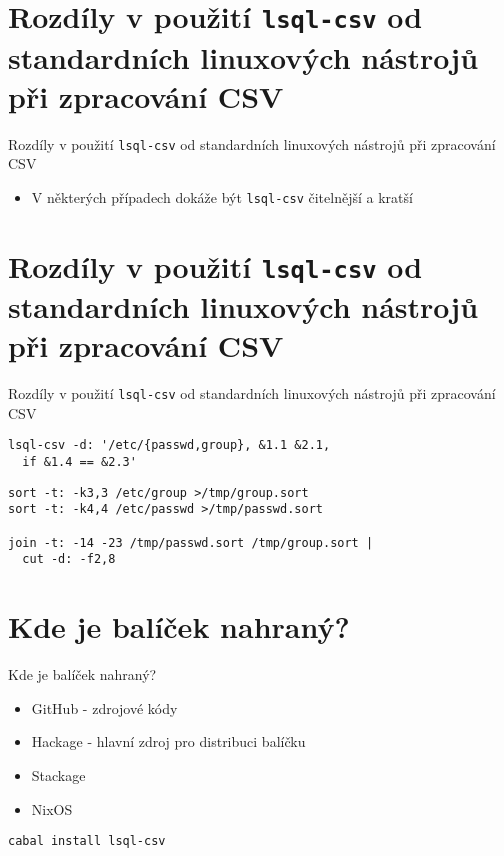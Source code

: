\documentclass{beamer}
\def\icode#1{\texttt{#1}}
\begin{document}
\section{Rozdíly v použití \icode{lsql-csv} od standardních linuxových nástrojů při zpracování CSV}
\begin{frame}[fragile]{Rozdíly v použití \icode{lsql-csv} od standardních linuxových nástrojů při zpracování CSV}
\begin{itemize}
\item V některých případech dokáže být \icode{lsql-csv} čitelnější a kratší
\end{itemize}
\end{frame}


\section{Rozdíly v použití \icode{lsql-csv} od standardních linuxových nástrojů při zpracování CSV}
\begin{frame}[fragile]{Rozdíly v použití \icode{lsql-csv} od standardních linuxových nástrojů při zpracování CSV}
\begin{verbatim}
lsql-csv -d: '/etc/{passwd,group}, &1.1 &2.1, 
  if &1.4 == &2.3'
\end{verbatim}


\vskip 1cm

\begin{verbatim}
sort -t: -k3,3 /etc/group >/tmp/group.sort
sort -t: -k4,4 /etc/passwd >/tmp/passwd.sort

join -t: -14 -23 /tmp/passwd.sort /tmp/group.sort |
  cut -d: -f2,8
\end{verbatim}
\end{frame}


\section{Kde je balíček nahraný?}
\begin{frame}[fragile]{Kde je balíček nahraný?}

\begin{itemize}
  \item GitHub - zdrojové kódy
\end{itemize}

\vskip 0.5cm

\begin{itemize}
  \item Hackage - hlavní zdroj pro distribuci balíčku
  \item Stackage
  \item NixOS
\end{itemize}

\vskip 1cm

\begin{verbatim}
cabal install lsql-csv
\end{verbatim}
\end{frame}
\end{document}
